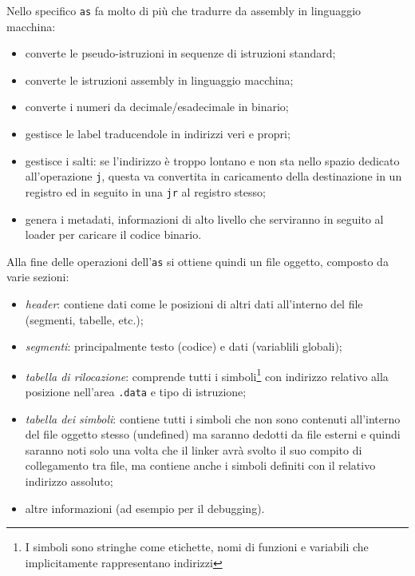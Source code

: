 \documentclass[class=book, crop=false, oneside]{standalone}
\begin{document}
Nello specifico \texttt{as} fa molto di più che tradurre da assembly in linguaggio macchina:
\begin{itemize}
	\item converte le pseudo-istruzioni in sequenze di istruzioni standard;
	\item converte le istruzioni assembly in linguaggio macchina;
	\item converte i numeri da decimale/esadecimale in binario;
	\item gestisce le label traducendole in indirizzi veri e propri;
	\item gestisce i salti: se l'indirizzo è troppo lontano e non sta nello spazio dedicato all'operazione \texttt{j}, questa va convertita in caricamento della destinazione in un registro ed in seguito in una \texttt{jr} al registro stesso;
	\item genera i metadati, informazioni di alto livello che serviranno in seguito al loader per caricare il codice binario.
\end{itemize}

Alla fine delle operazioni dell'\texttt{as} si ottiene quindi un file oggetto, composto da varie sezioni:
\begin{itemize}
	\item \emph{header}: contiene dati come le posizioni di altri dati all'interno del file (segmenti, tabelle, etc.);
	\item \emph{segmenti}: principalmente testo (codice) e dati (variablili globali);
	\item \emph{tabella di rilocazione}: comprende tutti i simboli\footnote{I simboli sono stringhe come etichette, nomi di funzioni e variabili che implicitamente rappresentano indirizzi} con indirizzo relativo alla posizione nell'area \texttt{.data} e tipo di istruzione;
	\item \emph{tabella dei simboli}: contiene tutti i simboli che non sono contenuti all'interno del file oggetto stesso (undefined) ma saranno dedotti da file esterni e quindi saranno noti solo una volta che il linker avrà svolto il suo compito di collegamento tra file, ma contiene anche i simboli definiti con il relativo indirizzo assoluto;
	\item altre informazioni (ad esempio per il debugging).
\end{itemize}
\end{document}
